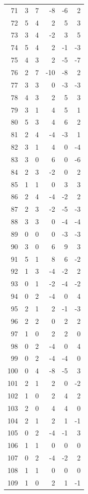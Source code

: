 \documentclass[11pt]{article}
\begin{document}
\begin{center}
\begin{longtable}{r r r r r r}
71 & 3 & 7 & -8 & -6 & 2\\
72 & 5 & 4 & 2 & 5 & 3\\
73 & 3 & 4 & -2 & 3 & 5\\
74 & 5 & 4 & 2 & -1 & -3\\
75 & 4 & 3 & 2 & -5 & -7\\
76 & 2 & 7 & -10 & -8 & 2\\
77 & 3 & 3 & 0 & -3 & -3\\
78 & 4 & 3 & 2 & 5 & 3\\
79 & 3 & 1 & 4 & 5 & 1\\
80 & 5 & 3 & 4 & 6 & 2\\
81 & 2 & 4 & -4 & -3 & 1\\
82 & 3 & 1 & 4 & 0 & -4\\
83 & 3 & 0 & 6 & 0 & -6\\
84 & 2 & 3 & -2 & 0 & 2\\
85 & 1 & 1 & 0 & 3 & 3\\
86 & 2 & 4 & -4 & -2 & 2\\
87 & 2 & 3 & -2 & -5 & -3\\
88 & 3 & 3 & 0 & -4 & -4\\
89 & 0 & 0 & 0 & -3 & -3\\
90 & 3 & 0 & 6 & 9 & 3\\
91 & 5 & 1 & 8 & 6 & -2\\
92 & 1 & 3 & -4 & -2 & 2\\
93 & 0 & 1 & -2 & -4 & -2\\
94 & 0 & 2 & -4 & 0 & 4\\
95 & 2 & 1 & 2 & -1 & -3\\
96 & 2 & 2 & 0 & 2 & 2\\
97 & 1 & 0 & 2 & 2 & 0\\
98 & 0 & 2 & -4 & 0 & 4\\
99 & 0 & 2 & -4 & -4 & 0\\
100 & 0 & 4 & -8 & -5 & 3\\
101 & 2 & 1 & 2 & 0 & -2\\
102 & 1 & 0 & 2 & 4 & 2\\
103 & 2 & 0 & 4 & 4 & 0\\
104 & 2 & 1 & 2 & 1 & -1\\
105 & 0 & 2 & -4 & -1 & 3\\
106 & 1 & 1 & 0 & 0 & 0\\
107 & 0 & 2 & -4 & -2 & 2\\
108 & 1 & 1 & 0 & 0 & 0\\
109 & 1 & 0 & 2 & 1 & -1\\
\bottomrule\end{longtable}
\end{center}
\end{document}
